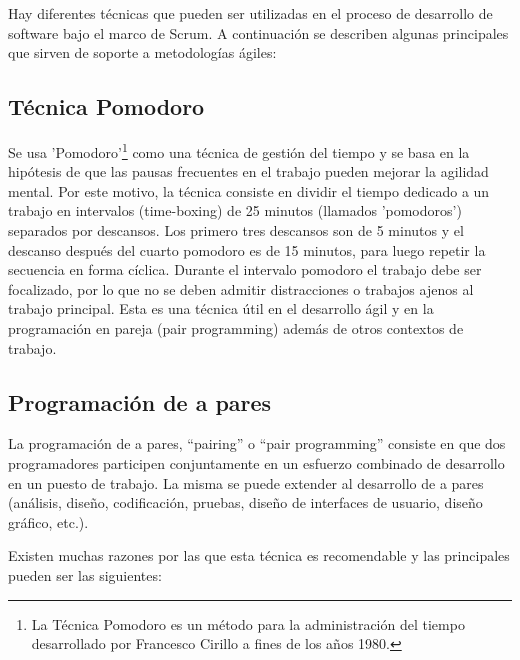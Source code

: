 Hay diferentes técnicas que pueden ser utilizadas en el proceso de desarrollo de software bajo el marco de Scrum. A continuación se describen algunas principales que sirven de soporte a metodologías ágiles:

\subsection{Técnica Pomodoro}

Se usa 'Pomodoro'\footnote{La Técnica Pomodoro es un método para la administración del tiempo desarrollado por Francesco Cirillo a fines de los años 1980\cite{Cirillo-Francesco-1980}.} como una técnica de gestión del tiempo y se basa en la hipótesis de que las pausas frecuentes en el trabajo pueden mejorar la agilidad mental. Por este motivo, la técnica consiste en dividir el tiempo dedicado a un trabajo en intervalos (time-boxing) de 25 minutos (llamados 'pomodoros') separados por descansos. Los primero tres descansos son de 5 minutos y el descanso después del cuarto pomodoro es de 15 minutos, para luego repetir la secuencia en forma cíclica. Durante el intervalo pomodoro el trabajo debe ser focalizado, por lo que no se deben admitir distracciones o trabajos ajenos al trabajo principal. 
Esta es una técnica útil en el desarrollo ágil y en la programación en pareja (pair programming) además de otros contextos de trabajo.

\subsection{Programación de a pares}

La programación de a pares, “pairing” o “pair programming” consiste en que dos programadores participen conjuntamente en un esfuerzo combinado de desarrollo en un puesto de trabajo. La misma se puede extender al desarrollo de a pares (análisis, diseño, codificación, pruebas, diseño de interfaces de usuario, diseño gráfico, etc.).

Existen muchas razones por las que esta técnica es recomendable y las principales pueden ser las siguientes:

